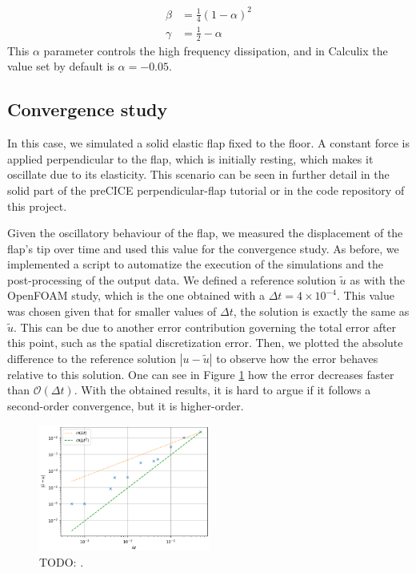 \documentclass[
  english,        %
  font=times,     %
  onecolumn,      %
]{tumarticle}
\begin{document}
\begin{align}
    \beta &= \frac{1}{4}(1 - \alpha)^2 \\
    \gamma &= \frac{1}{2} - \alpha
\end{align}
This $\alpha$ parameter controls the high frequency dissipation, and in Calculix the value set by default is $\alpha=-0.05$.

\subsection{Convergence study}
In this case, we simulated a solid elastic flap fixed to the floor. A constant force is applied perpendicular to the flap, which is initially resting, which makes it oscillate due to its elasticity. This scenario can be seen in further detail in the solid part of the preCICE perpendicular-flap tutorial \cite{perpendicularFlap} or in the code repository of this project.

Given the oscillatory behaviour of the flap, we measured the displacement of the flap's tip over time and used this value for the convergence study. As before, we implemented a script to automatize the execution of the simulations and the post-processing of the output data. We defined a reference solution $\tilde{u}$ as with the OpenFOAM study, which is the one obtained with a $\Delta t = 4\times 10^{-4}$. This value was chosen given that for smaller values of $\Delta t$, the solution is exactly the same as $\tilde{u}$. This can be due to another error contribution governing the total error after this point, such as the spatial discretization error. Then, we plotted the absolute difference to the reference solution $|u - \tilde{u}|$ to observe how the error behaves relative to this solution. One can see in Figure \ref{fig:calculix_convergence} how the error decreases faster than $\mathcal{O}(\Delta t)$. With the obtained results, it is hard to argue if it follows a second-order convergence, but it is higher-order.

\begin{figure}[!ht]
    \centering
    \includegraphics[width=0.5\textwidth]{resources/calculix_convergence_study.png}
    \caption{TODO: .}
    \label{fig:calculix_convergence}
\end{figure}
\end{document}
